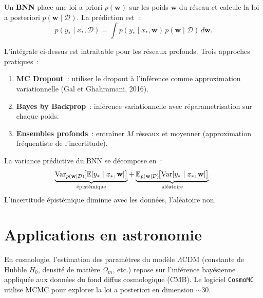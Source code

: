 \begin{definition}
Un \textbf{BNN} place une loi a priori $p(\mathbf{w})$ sur les poids
$\mathbf{w}$ du r\'eseau et calcule la loi a posteriori
$p(\mathbf{w} \mid \mathcal{D})$. La pr\'ediction est~:
\[
  p(y_* \mid x_*, \mathcal{D}) = \int p(y_* \mid x_*, \mathbf{w})\,
  p(\mathbf{w} \mid \mathcal{D})\,d\mathbf{w}.
\]
\end{definition}

\begin{remarque}
L'int\'egrale ci-dessus est intraitable pour les r\'eseaux profonds.
Trois approches pratiques~:
\begin{enumerate}
  \item \textbf{MC Dropout}~: utiliser le dropout \`a l'inf\'erence comme
        approximation variationnelle (Gal et Ghahramani, 2016).
  \item \textbf{Bayes by Backprop}~: inf\'erence variationnelle avec
        r\'eparametrisation sur chaque poids.
  \item \textbf{Ensembles profonds}~: entra\^iner $M$ r\'eseaux et moyenner
        (approximation fr\'equentiste de l'incertitude).
\end{enumerate}
\end{remarque}

\begin{proposition}
La variance pr\'edictive du BNN se d\'ecompose en~:
\[
  \underbrace{\mathrm{Var}_{p(\mathbf{w} \mid \mathcal{D})}\!\bigl[\mathbb{E}[y_* \mid x_*, \mathbf{w}]\bigr]}_{\text{\'epist\'emique}}
  + \underbrace{\mathbb{E}_{p(\mathbf{w} \mid \mathcal{D})}\!\bigl[\mathrm{Var}[y_* \mid x_*, \mathbf{w}]\bigr]}_{\text{al\'eatoire}}.
\]
L'incertitude \'epist\'emique diminue avec les donn\'ees, l'al\'eatoire non.
\end{proposition}

\section{Applications en astronomie}

\begin{exemple}
En cosmologie, l'estimation des param\`etres du mod\`ele $\Lambda$CDM
(constante de Hubble $H_0$, densit\'e de mati\`ere $\Omega_m$, etc.)
repose sur l'inf\'erence bay\'esienne appliqu\'ee aux donn\'ees du fond
diffus cosmologique (CMB). Le logiciel \texttt{CosmoMC} utilise MCMC
pour explorer la loi a posteriori en dimension $\sim 30$.
\end{exemple}

